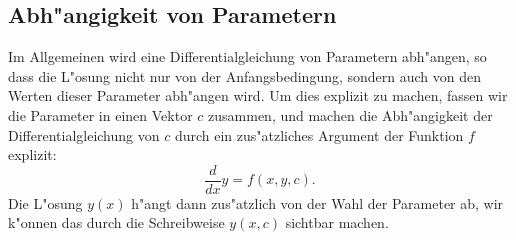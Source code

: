 %

\subsection{Abh"angigkeit von Parametern}
%
Im Allgemeinen wird eine Differentialgleichung von Parametern abh"angen,
so dass die L"osung nicht nur von der Anfangsbedingung, sondern auch von den
Werten dieser Parameter abh"angen wird.
Um dies explizit zu machen, fassen wir die Parameter in einen Vektor $c$
zusammen, und machen die Abh"angigkeit der Differentialgleichung
von $c$ durch ein zus"atzliches Argument der Funktion $f$ explizit:
\[
\frac{d}{dx}y = f(x,y,c).
\]
Die L"osung $y(x)$ h"angt dann zus"atzlich von der Wahl der Parameter
ab, wir k"onnen das durch die Schreibweise $y(x,c)$ sichtbar machen.

